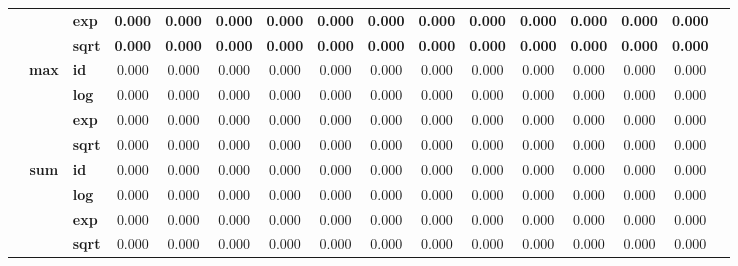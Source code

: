 \begin{table}[ht!]
{\begin{tabular}{cclccccccccccccc}
                & & \textbf{exp}  & \textbf{0.000} & \textbf{0.000} & \textbf{0.000} & \textbf{0.000} & \textbf{0.000} & \textbf{0.000} & \textbf{0.000} & \textbf{0.000} & \textbf{0.000} & \textbf{0.000} & \textbf{0.000} & \textbf{0.000} \\
                & & \textbf{sqrt} & \textbf{0.000} & \textbf{0.000} & \textbf{0.000} & \textbf{0.000} & \textbf{0.000} & \textbf{0.000} & \textbf{0.000} & \textbf{0.000} & \textbf{0.000} & \textbf{0.000} & \textbf{0.000} & \textbf{0.000} \\
        \cmidrule{2-15}
        & \multirow{4}{*}{\textbf{max}}
                  & \textbf{id}   & 0.000 & 0.000 & 0.000 & 0.000 & 0.000 & 0.000 & 0.000 & 0.000 & 0.000 & 0.000 & 0.000 & 0.000 \\
                & & \textbf{log}  & 0.000 & 0.000 & 0.000 & 0.000 & 0.000 & 0.000 & 0.000 & 0.000 & 0.000 & 0.000 & 0.000 & 0.000 \\
                & & \textbf{exp}  & 0.000 & 0.000 & 0.000 & 0.000 & 0.000 & 0.000 & 0.000 & 0.000 & 0.000 & 0.000 & 0.000 & 0.000 \\
                & & \textbf{sqrt} & 0.000 & 0.000 & 0.000 & 0.000 & 0.000 & 0.000 & 0.000 & 0.000 & 0.000 & 0.000 & 0.000 & 0.000 \\
        \cmidrule{2-15}
        & \multirow{4}{*}{\textbf{sum}}
                  & \textbf{id}   & 0.000 & 0.000 & 0.000 & 0.000 & 0.000 & 0.000 & 0.000 & 0.000 & 0.000 & 0.000 & 0.000 & 0.000 \\
                & & \textbf{log}  & 0.000 & 0.000 & 0.000 & 0.000 & 0.000 & 0.000 & 0.000 & 0.000 & 0.000 & 0.000 & 0.000 & 0.000 \\
                & & \textbf{exp}  & 0.000 & 0.000 & 0.000 & 0.000 & 0.000 & 0.000 & 0.000 & 0.000 & 0.000 & 0.000 & 0.000 & 0.000 \\
                & & \textbf{sqrt} & 0.000 & 0.000 & 0.000 & 0.000 & 0.000 & 0.000 & 0.000 & 0.000 & 0.000 & 0.000 & 0.000 & 0.000 \\
        \midrule


\end{tabular}}
\end{table}
